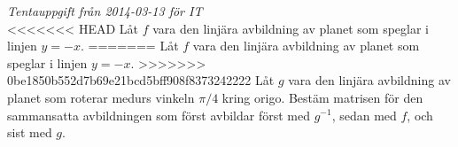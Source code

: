 {\it Tentauppgift från 2014-03-13 för IT}\\
<<<<<<< HEAD
Låt $f$ vara den linjära avbildning av planet som speglar i linjen $y=-x$.
=======
Låt $f$ vara den linjära avbildning av planet som speglar i linjen $y = -x$.
>>>>>>> 0be1850b552d7b69e21bcd5bff908f8373242222
Låt $g$ vara den linjära avbildning av planet som roterar medurs vinkeln
$\pi/4$ kring origo. Bestäm matrisen för den sammansatta avbildningen som
först avbildar först med $g^{-1}$, sedan med $f$, och sist med $g$.